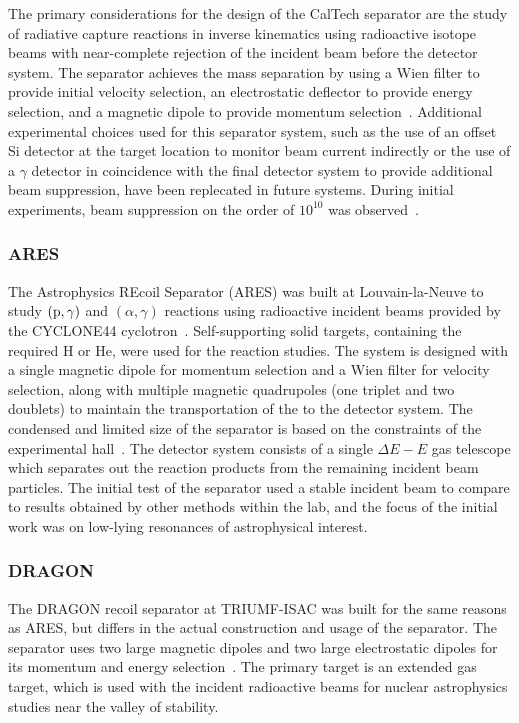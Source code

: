 The primary considerations for the design of the CalTech separator are the
study of radiative capture reactions in inverse kinematics using radioactive
isotope beams with near-complete rejection of the incident beam before the
detector system. The separator achieves the mass separation by using a Wien
filter to provide initial velocity selection, an electrostatic deflector to
provide energy selection, and a magnetic dipole to provide momentum
selection~\cite{Smith1991}. Additional experimental choices used for this
separator system, such as the use of an offset Si detector at the target
location to monitor beam current indirectly or the use of a $\gamma$ detector
in coincidence with the final detector system to provide additional beam
suppression, have been replecated in future systems. During initial
experiments, beam suppression on the order of $10^{10}$ was
observed~\cite{Smith1991}.

\subsubsection{ARES}
The Astrophysics REcoil Separator (ARES) was built at Louvain-la-Neuve to
study $(\rm{p},\gamma)$ and $(\alpha,\gamma)$ reactions using radioactive
incident beams provided by the CYCLONE44 cyclotron~\cite{Angulo2001}.
Self-supporting solid targets, containing the required H or He, were used for
the reaction studies. The system is designed with a single magnetic dipole for
momentum selection and a Wien filter for velocity selection, along with
multiple magnetic quadrupoles (one triplet and two doublets) to maintain the
transportation of the to the
detector system. The condensed and limited size of the separator is based on
the constraints of the experimental hall~\cite{Couder2003}. The detector system
consists of a single $\Delta E − E$ gas telescope which separates out the reaction
products from the remaining incident beam particles. The initial test of the
separator used a stable incident beam to compare to results obtained by other
methods within the lab, and the focus of the initial work was on low-lying
resonances of astrophysical interest.

\subsubsection{DRAGON}
The DRAGON recoil separator at TRIUMF-ISAC was built for the same reasons as ARES,
but differs in the actual construction and usage of the separator. The
separator uses two large magnetic dipoles and two large electrostatic dipoles
for its momentum and energy selection~\cite{Engel2005}. The primary target is
an extended gas target, which is used with the incident radioactive beams for
nuclear astrophysics studies near the valley of stability.

